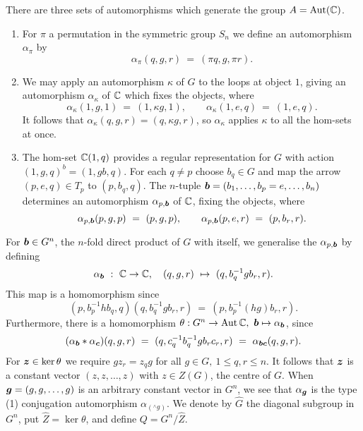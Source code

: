 \medskip
There are three sets of automorphisms which generate the group 
$A = \mathrm{Aut}(\mathbb{C})$. 
\begin{enumerate}[(1)] 
\item
For $\pi$ a permutation in the symmetric group $S_n$ 
we define an automorphism $\alpha_{\pi}$ by 
$$
\alpha_{\pi}(q,g,r) ~=~ (\pi q, g,\pi r).
$$

\item
We may apply an automorphism $\kappa$ of $G$ to the loops at object $1$, 
giving an automorphism $\alpha_{\kappa}$ of $\mathbb{C}$ 
which fixes the objects, where 
$$
\alpha_{\kappa}(1,g,1) ~=~ (1,\kappa g,1), \qquad 
\alpha_{\kappa}(1,e,q) ~=~ (1,e,q).
$$ 
It follows that $\alpha_{\kappa}(q,g,r) = (q,\kappa g,r)$, 
so $\alpha_{\kappa}$ applies $\kappa$ to all the hom-sets at once. 

\item
The hom-set $\mathbb{C}(1,q)$ provides a regular representation for $G$ 
with action $(1,g,q)^b = (1,gb,q)$. 
For each $q \neq p$ choose $b_q \in G$ and map the arrow $(p,e,q) \in T_p$ 
to $(p,b_q,q)$. 
The $n$-tuple $\boldsymbol{b} = (b_1,\ldots,b_p=e,\ldots,b_n)$ determines an 
automorphism $\alpha_{p,\boldsymbol{b}}$ of $\mathbb{C}$, fixing the objects, where 
$$
\alpha_{p,\boldsymbol{b}}(p,g,p) ~=~ (p,g,p), \qquad 
\alpha_{p,\boldsymbol{b}}(p,e,r) ~=~ (p,b_r,r). 
$$
\end{enumerate}

\noindent
For $\boldsymbol{b} \in G^n$, the $n$-fold direct product of $G$ with itself, 
we generalise the $\alpha_{p,\boldsymbol{b}}$ by defining 
$$
\alpha_{\boldsymbol{b}} ~:~ \mathbb{C} \to \mathbb{C}, \quad 
(q,g,r) ~\mapsto~ (q,b_q^{-1}gb_r,r). 
$$
This map is a homomorphism since 
$$
(p,b_p^{-1}hb_q,q)(q,b_q^{-1}gb_r,r) ~=~ (p,b_p^{-1}(hg)b_r,r).
$$
Furthermore, there is a homomorphism 
$\theta : G^n \to \mathrm{Aut}\,\mathbb{C},~ \boldsymbol{b} \mapsto \alpha_{\boldsymbol{b}}$, since 
$$
(\alpha_{\boldsymbol{b}} * \alpha_{\boldsymbol{c}})(q,g,r) 
~=~ (q,c^{-1}_qb^{-1}_qgb_rc_r,r) 
~=~ \alpha_{\boldsymbol{b}\boldsymbol{c}}(q,g,r). 
$$
For $\boldsymbol{z} \in \ker\theta$ we require 
$gz_r = z_qg$ for all $g \in G,~ 1 \leqslant q,r \leqslant n$. 
It follows that $\boldsymbol{z}$ is a constant vector $(z,z,\ldots,z)$ 
with $z \in Z(G)$, the centre of $G$. 
When $\boldsymbol{g} = (g,g,\ldots,g)$ is an arbitrary constant vector in $G^n$, 
we see that $\alpha_{\boldsymbol{g}}$ is the type (1) conjugation automorphism 
$\alpha_{({}^{\wedge} g)}$. 
We denote by $\hat{G}$ the diagonal subgroup in $G^n$, 
put $\hat{Z} = \ker\theta$, and define $Q = G^n/\hat{Z}$. 

